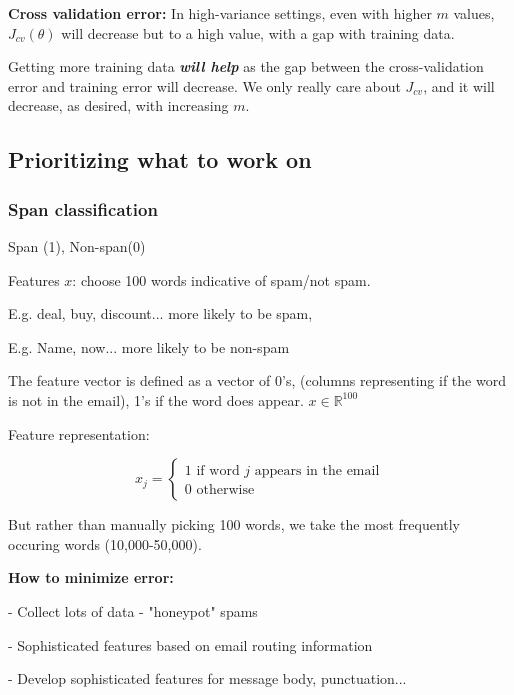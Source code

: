 \documentclass{article}
\begin{document}
\textbf{Cross validation error:} In high-variance settings, even with higher $m$ values, $J_{cv}(\theta)$ will decrease but to a high value, with a gap with training data. 


\begin{mybox}
    Getting more training data \textbf{\textit{will help}} as the gap between the cross-validation error and training error will decrease. We only really care about $J_{cv}$, and it will decrease, as desired, with increasing $m$.
\end{mybox}




\subsection{Prioritizing what to work on}

\subsubsection{Span classification}

Span (1), Non-span(0) 

Features $x$: choose 100 words indicative of spam/not spam.

E.g. deal, buy, discount... more likely to be spam,

E.g. Name, now... more likely to be non-spam

The feature vector is defined as a vector of 0's, (columns representing if the word is not in the email), 1's if the word does appear. $x \in \mathbb{R}^{100}$

Feature representation:

\begin{equation}
    x_j =
    \left\{
    \begin{array}{ll}
    1 \text{ if word $j$ appears in the email} \\
    0 \text{ otherwise} 
    \end{array} \right.
\end{equation} 

But rather than manually picking 100 words, we take the most frequently occuring words (10,000-50,000).




\textbf{How to minimize error:}

- Collect lots of data - "honeypot" spams 

- Sophisticated features based on email routing information

- Develop sophisticated features for message body, punctuation...
\end{document}
